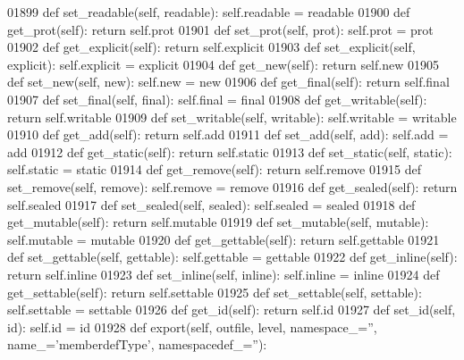 \begin{DoxyCode}
{{{{{{{{{{{{{{{{{{{{{{{{{{{{{{{{{{{{{{{{{{{{{{{{{{{{{{{{{{{{{{{{{{{{{{{{{{{{{{{{{{{{{{{{{{{{{{{{{{{{{{{{{{{{{{{{{{01899     \textcolor{keyword}{def }set_readable(self, readable): self.readable = readable
01900     \textcolor{keyword}{def }get_prot(self): \textcolor{keywordflow}{return} self.prot
01901     \textcolor{keyword}{def }set_prot(self, prot): self.prot = prot
01902     \textcolor{keyword}{def }get_explicit(self): \textcolor{keywordflow}{return} self.explicit
01903     \textcolor{keyword}{def }set_explicit(self, explicit): self.explicit = explicit
01904     \textcolor{keyword}{def }get_new(self): \textcolor{keywordflow}{return} self.new
01905     \textcolor{keyword}{def }set_new(self, new): self.new = new
01906     \textcolor{keyword}{def }get_final(self): \textcolor{keywordflow}{return} self.final
01907     \textcolor{keyword}{def }set_final(self, final): self.final = final
01908     \textcolor{keyword}{def }get_writable(self): \textcolor{keywordflow}{return} self.writable
01909     \textcolor{keyword}{def }set_writable(self, writable): self.writable = writable
01910     \textcolor{keyword}{def }get_add(self): \textcolor{keywordflow}{return} self.add
01911     \textcolor{keyword}{def }set_add(self, add): self.add = add
01912     \textcolor{keyword}{def }get_static(self): \textcolor{keywordflow}{return} self.static
01913     \textcolor{keyword}{def }set_static(self, static): self.static = static
01914     \textcolor{keyword}{def }get_remove(self): \textcolor{keywordflow}{return} self.remove
01915     \textcolor{keyword}{def }set_remove(self, remove): self.remove = remove
01916     \textcolor{keyword}{def }get_sealed(self): \textcolor{keywordflow}{return} self.sealed
01917     \textcolor{keyword}{def }set_sealed(self, sealed): self.sealed = sealed
01918     \textcolor{keyword}{def }get_mutable(self): \textcolor{keywordflow}{return} self.mutable
01919     \textcolor{keyword}{def }set_mutable(self, mutable): self.mutable = mutable
01920     \textcolor{keyword}{def }get_gettable(self): \textcolor{keywordflow}{return} self.gettable
01921     \textcolor{keyword}{def }set_gettable(self, gettable): self.gettable = gettable
01922     \textcolor{keyword}{def }get_inline(self): \textcolor{keywordflow}{return} self.inline
01923     \textcolor{keyword}{def }set_inline(self, inline): self.inline = inline
01924     \textcolor{keyword}{def }get_settable(self): \textcolor{keywordflow}{return} self.settable
01925     \textcolor{keyword}{def }set_settable(self, settable): self.settable = settable
01926     \textcolor{keyword}{def }get_id(self): \textcolor{keywordflow}{return} self.id
01927     \textcolor{keyword}{def }set_id(self, id): self.id = id
01928     \textcolor{keyword}{def }export(self, outfile, level, namespace\_='', name\_='memberdefType', namespacedef\_=''):
}}}}}}}}}}}}}}}}}}}}}}}}}}}}}}}}}}}}}}}}}}}}}}}}}}}}}}}}}}}}}}}}}}}}}}}}}}}}}}}}}}}}}}}}}}}}}}}}}}}}}}}}}}}}}}}}}}
\end{DoxyCode}
